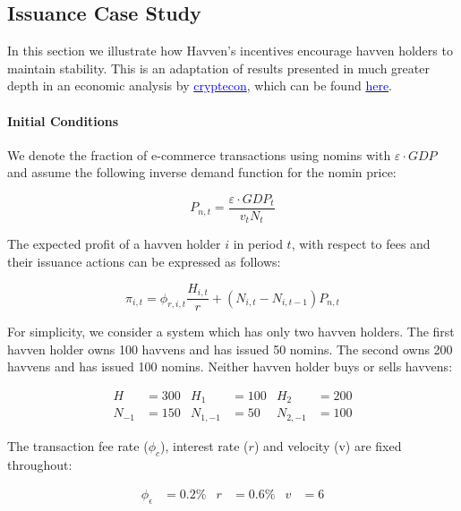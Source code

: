 \newpage

\subsection{Issuance Case Study} In this section we illustrate how Havven's
incentives encourage havven holders to maintain stability. This is an adaptation
of results presented in much greater depth in an economic analysis by \href{http://cryptecon.org/}{\textcolor{blue}{cryptecon}},
which can be found \href{https://havven.io/uploads/havven_cryptecon_report_may_2018.pdf}{\textcolor{blue}{here}}.

\paragraph {Initial Conditions}
\noindent We denote the fraction of e-commerce transactions using nomins with $\varepsilon \cdot GDP$ and
assume the following inverse demand function for the nomin price:

\begin{equation*} \label{eq:nominprice} P_{n,t} = \frac{\varepsilon \cdot GDP_t}{v_tN_t} \end{equation*}

\noindent The expected profit of a havven holder \(i\) in period \(t\), with
respect to fees and their issuance actions can be expressed as follows:

\begin{equation*} 
\pi_{i,t} = \phi_{r,i,t} \frac{H_{i,t}}{r} + (N_{i,t} - N_{i,t-1}) P_{n,t} \label{eq:profit}
\end{equation*}


\noindent For simplicity, we consider a system which
has only two havven holders. The first havven holder owns 100 havvens and has
issued 50 nomins. The second owns 200 havvens and has issued 100 nomins.
Neither havven holder buys or sells havvens:

\begin{align*}
H &= 300 & H_1 &= 100 & H_2 &= 200 \\
N_{-1} &= 150 & N_{1,-1} &= 50 & N_{2,-1} &= 100
\end{align*}

\noindent The transaction fee rate (\(\phi_c\)), interest rate (\(r\)) and
velocity (v) are fixed throughout:

\begin{align*}
\phi_\epsilon &= 0.2\% & r &= 0.6\%  & v &= 6
\end{align*}

